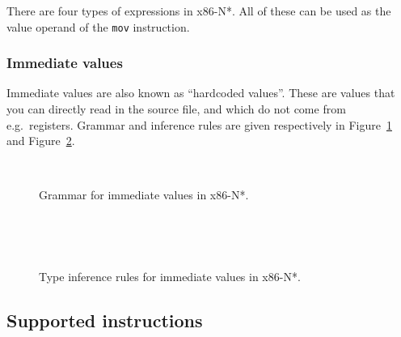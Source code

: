 There are four types of expressions in x86-N*.
All of these can be used as the value operand of the \texttt{mov} instruction.

\subsubsection{Immediate values}\label{subsubsec:nstar-specific-x86amd64-exprs-immediate}

Immediate values are also known as ``hardcoded values''.
These are values that you can directly read in the source file, and which do not come from e.g.\ registers.
Grammar and inference rules are given respectively in Figure~\ref{fig:nstar-specific-x86amd64-exprs-immediate-grammar} and Figure~\ref{fig:nstar-specific-x86amd64-exprs-immediate-typerules}.

\begin{figure}[htb]
  \centering
  \\
  \caption{Grammar for immediate values in x86-N*.}
  \label{fig:nstar-specific-x86amd64-exprs-immediate-grammar}
\end{figure}

\begin{figure}[htb]
  \centering

  \begin{prooftree}
  \end{prooftree}
  \\\vspace{\baselineskip}
  \begin{prooftree}
  \end{prooftree}
  \\\vspace{\baselineskip}
  \begin{prooftree}
  \end{prooftree}

  \caption{Type inference rules for immediate values in x86-N*.}
  \label{fig:nstar-specific-x86amd64-exprs-immediate-typerules}
\end{figure}

\subsection{Supported instructions}\label{subsec:nstar-specific-x86amd64-instructions}
